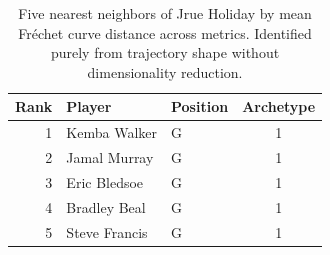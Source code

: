 \begin{table}[htbp]
  \centering\small
  \begin{tabular}{rllc}
    \toprule
    Rank & Player & Position & Archetype \\
    \midrule
    1 & Kemba Walker & G & 1 \\
    2 & Jamal Murray & G & 1 \\
    3 & Eric Bledsoe & G & 1 \\
    4 & Bradley Beal & G & 1 \\
    5 & Steve Francis & G & 1 \\
    \bottomrule
  \end{tabular}
  \caption{Five nearest neighbors of Jrue Holiday by mean Fr\'{e}chet curve distance across metrics. Identified purely from trajectory shape without dimensionality reduction.}
  \label{tab:Jrue_Holiday_frechet_curve_neighbors}
\end{table}

